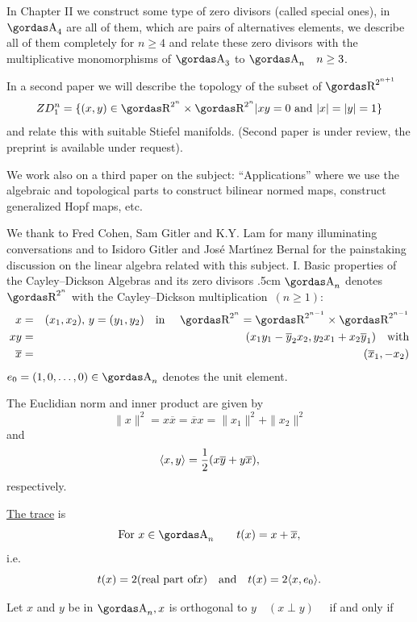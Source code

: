 \par 
In Chapter II we construct some type of zero divisors (called special ones), in 
$\a_{4}$ are all of them, which are pairs of alternatives elements, 
we 
describe all of them completely for $n\ge 4$ 
and relate these zero divisors with the 
multiplicative monomorphisms of $\a_{3}$ to $\a_{n}\quad n\ge 3$.
\par 
In a second paper we will describe the topology of the subset of 
$\erre^{2^{n+1}}$%
$$
ZD^{n}_{1}=\{(x,y)\in \erre^{2^n}\times \erre^{2^n}|xy=0\,\,\hbox{\bs and}\,\,
|x|=|y|=1\}$$
and relate this with suitable Stiefel manifolds. (Second paper is under review, the preprint is available under
request).
\par 
We work also on a third paper on the subject: ``Applications'' where we use 
the algebraic and topological parts to construct bilinear normed maps, 
construct generalized Hopf maps, etc.
\par 
We thank to Fred Cohen, Sam Gitler and K.Y. Lam for many illuminating
conversations and to Isidoro Gitler and Jos\'e Mart{\'\i}nez Bernal for the 
painstaking discussion on the linear algebra related with this subject.
\newpage
\noindent
{\bsbf I. Basic properties of the Cayley--Dickson Algebras and its zero 
divisors}
\vglue.5cm
$\a_{n}$  denotes $\erre^{2^n}$ with the Cayley--Dickson multiplication 
$\,(n\ge 1)$:
\begin{eqnarray*}
x&=&(x_{1},x_{2}), \,y=(y_{1},y_{2})\quad\hbox{\bs in }\quad \erre^{2^n}=
\erre^{2^{n-1}}
\times \erre^{2^{n-1}} \\ 
xy&=&(x_{1}y_{1}-\overline{y}_{2}x_{2}, 
y_{2}x_{1}+x_{2}\overline{y}_{1})\quad \hbox{\bs with}\\ 
\overline{x}&=&(\overline{x}_{1},-x_{2})
\end{eqnarray*} 
$e_{0}=(1,0,\ldots,0)\in \a_{n}$ denotes the unit element. 
\par 
The Euclidian norm and inner product  are given by 
$$\parallel x\parallel^{2}=x\overline{x}=\overline{x}x=
\parallel x_{1}\parallel^{2}+\parallel x_{2}\parallel^{2}$$ 
and
$$\langle x,y\rangle={ 1\over 2 }(x\overline{y}+y\overline{x}),$$ 
respectively. 
\par 
\underline{The trace} is 
$$\hbox{\bs For}\,\, x\in \a_{n} \qquad t(x)=x+\overline{x},$$ 
i.e.
$$t(x)=2 (\hbox{\rm real part of} x)\quad \hbox{\rm and}\quad 
t(x)=2\langle x,e_{0}\rangle.$$
\par 
Let $x$ and $y$ be in $\a_{n}, x$ is orthogonal to 
$y\quad (x\perp y)\quad$ if and only
if \\
